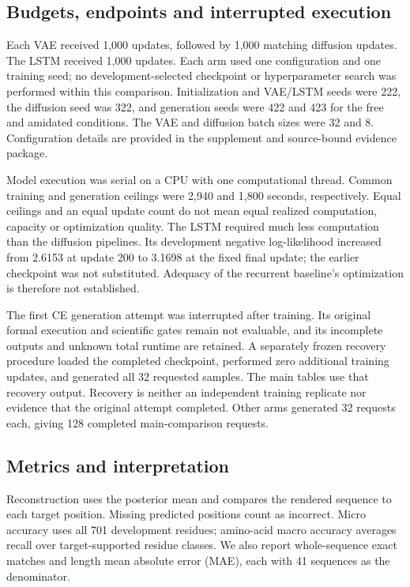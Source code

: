 \documentclass[12pt,a4paper]{article}
\begin{document}
\subsection{Budgets, endpoints and interrupted execution}
Each VAE received 1,000 updates, followed by 1,000 matching diffusion updates. The LSTM received 1,000 updates. Each arm used one configuration and one training seed; no development-selected checkpoint or hyperparameter search was performed within this comparison. Initialization and VAE/LSTM seeds were 222, the diffusion seed was 322, and generation seeds were 422 and 423 for the free and amidated conditions. The VAE and diffusion batch sizes were 32 and 8. Configuration details are provided in the supplement and source-bound evidence package.

Model execution was serial on a CPU with one computational thread. Common training and generation ceilings were 2,940 and 1,800 seconds, respectively. Equal ceilings and an equal update count do not mean equal realized computation, capacity or optimization quality. The LSTM required much less computation than the diffusion pipelines. Its development negative log-likelihood increased from 2.6153 at update 200 to 3.1698 at the fixed final update; the earlier checkpoint was not substituted. Adequacy of the recurrent baseline's optimization is therefore not established.

The first CE generation attempt was interrupted after training. Its original formal execution and scientific gates remain not evaluable, and its incomplete outputs and unknown total runtime are retained. A separately frozen recovery procedure loaded the completed checkpoint, performed zero additional training updates, and generated all 32 requested samples. The main tables use that recovery output. Recovery is neither an independent training replicate nor evidence that the original attempt completed. Other arms generated 32 requests each, giving 128 completed main-comparison requests.

\subsection{Metrics and interpretation}
Reconstruction uses the posterior mean and compares the rendered sequence to each target position. Missing predicted positions count as incorrect. Micro accuracy uses all 701 development residues; amino-acid macro accuracy averages recall over target-supported residue classes. We also report whole-sequence exact matches and length mean absolute error (MAE), each with 41 sequences as the denominator.
\end{document}
